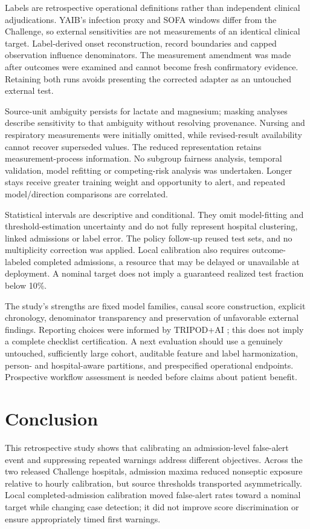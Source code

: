 \documentclass[preprint,12pt]{elsarticle}
\begin{document}
Labels are retrospective operational definitions rather than independent clinical adjudications. YAIB's infection proxy and SOFA windows differ from the Challenge, so external sensitivities are not measurements of an identical clinical target. Label-derived onset reconstruction, record boundaries and capped observation influence denominators. The measurement amendment was made after outcomes were examined and cannot become fresh confirmatory evidence. Retaining both runs avoids presenting the corrected adapter as an untouched external test.

Source-unit ambiguity persists for lactate and magnesium; masking analyses describe sensitivity to that ambiguity without resolving provenance. Nursing and respiratory measurements were initially omitted, while revised-result availability cannot recover superseded values. The reduced representation retains measurement-process information. No subgroup fairness analysis, temporal validation, model refitting or competing-risk analysis was undertaken. Longer stays receive greater training weight and opportunity to alert, and repeated model/direction comparisons are correlated.

Statistical intervals are descriptive and conditional. They omit model-fitting and threshold-estimation uncertainty and do not fully represent hospital clustering, linked admissions or label error. The policy follow-up reused test sets, and no multiplicity correction was applied. Local calibration also requires outcome-labeled completed admissions, a resource that may be delayed or unavailable at deployment. A nominal target does not imply a guaranteed realized test fraction below 10\%.

The study's strengths are fixed model families, causal score construction, explicit chronology, denominator transparency and preservation of unfavorable external findings. Reporting choices were informed by TRIPOD+AI \cite{tripod}; this does not imply a complete checklist certification. A next evaluation should use a genuinely untouched, sufficiently large cohort, auditable feature and label harmonization, person- and hospital-aware partitions, and prespecified operational endpoints. Prospective workflow assessment is needed before claims about patient benefit.

\section{Conclusion}
This retrospective study shows that calibrating an admission-level false-alert event and suppressing repeated warnings address different objectives. Across the two released Challenge hospitals, admission maxima reduced nonseptic exposure relative to hourly calibration, but source thresholds transported asymmetrically. Local completed-admission calibration moved false-alert rates toward a nominal target while changing case detection; it did not improve score discrimination or ensure appropriately timed first warnings.
\end{document}
